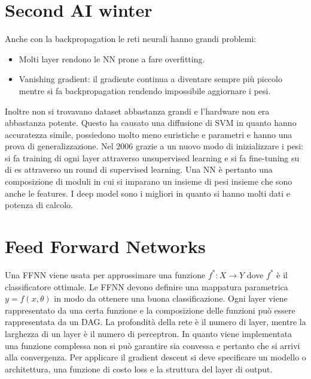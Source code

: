 \section{Second AI winter}
Anche con la backpropagation le reti neurali hanno grandi problemi:
\begin{itemize}
	\item Molti layer rendono le NN prone a fare overfitting.
	\item Vanishing gradient: il gradiente continua a diventare sempre pi\`u piccolo mentre si fa backpropagation rendendo impossibile aggiornare i pesi.
\end{itemize}
Inoltre non si trovavano dataset abbastanza grandi e l'hardware non era abbastanza potente.
Questo ha causato una diffusione di SVM in quanto hanno accuratezza simile, possiedono molto meno euristiche e parametri e hanno una prova di generalizzazione.
Nel $2006$ grazie a un nuovo modo di inizializzare i pesi: si fa training di ogni layer attraverso unsupervised learning e si fa fine-tuning su di es attraverso un round di supervised learning.
Una NN \`e pertanto una composizione di moduli in cui si imparano un insieme di pesi insieme che sono anche le features.
I deep model sono i migliori in quanto si hanno molti dati e potenza di calcolo.

\section{Feed Forward Networks}
Una FFNN viene usata per approssimare una funzione $f^*:X\rightarrow Y$ dove $f^*$ \`e il classificatore ottimale.
Le FFNN devono definire una mappatura parametrica $y = f(x,\theta)$ in modo da ottenere una buona classificazione.
Ogni layer viene rappresentato da una certa funzione e la composizione delle funzioni pu\`o essere rappresentata da un DAG.
La profondit\`a della rete \`e il numero di layer, mentre la larghezza di un layer \`e il numero di perceptron.
In quanto viene implementata una funzione complessa non si pu\`o garantire sia convessa e pertanto che si arrivi alla convergenza.
Per applicare il gradient descent si deve specificare un modello o architettura, una funzione di costo loss e la struttura del layer di output.

